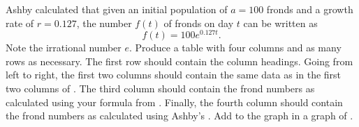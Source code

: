 \documentclass[a4paper,oneside,12pt]{article}
\begin{document}
\begin{problem}
\begin{packedenum}
  \item\label{subprob:exponential:duckweeds_growth_factor_exponential}
    Ashby calculated that given an initial population of $a = 100$
    fronds and a growth rate of $r = 0.127$, the number $f(t)$ of
    fronds on day $t$ can be written as
    \begin{equation}
    \label{eqn:exponential:frond_numbers_Ashby_formula}
    f(t)
    =
    100 e^{0.127t}.
    \end{equation}
    Note the irrational number $e$.  Produce a table with four columns
    and as many rows as necessary.  The first row should contain the
    column headings.  Going from left to right, the first two columns
    should contain the same data as in the first two columns of
    .  The third
    column should contain the frond numbers as calculated using your
    formula
    from .
    Finally, the fourth column should contain the frond numbers as
    calculated using Ashby's
    .  Add to
    the graph
    in  a
    graph of .


\end{packedenum}
\end{problem}
\end{document}
